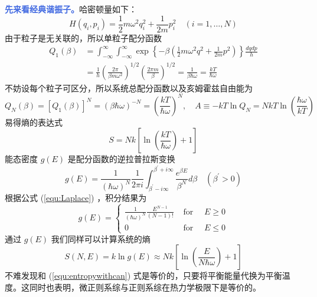 \textcolor{RoyalBlue}{\textbf{\kaishu 先来看经典谐振子。}}哈密顿量如下：
\begin{equation}
    H\left(q_i, p_i\right)=\frac{1}{2} m \omega^2 q_i^2+\frac{1}{2 m} p_i^2 \quad(i=1, \ldots, N)
\end{equation}
由于粒子是无关联的，所以单粒子配分函数
\begin{equation}
    \begin{aligned}
        Q_1(\beta) & =\int_{-\infty}^{\infty} \int_{-\infty}^{\infty} \exp \left\{-\beta\left(\frac{1}{2} m \omega^2 q^2+\frac{1}{2 m} p^2\right)\right\} \frac{d q d p}{h} \\
        & =\frac{1}{h}\left(\frac{2 \pi}{\beta m \omega^2}\right)^{1 / 2}\left(\frac{2 \pi m}{\beta}\right)^{1 / 2}=\frac{1}{\beta \hbar \omega}=\frac{k T}{\hbar \omega}
        \end{aligned}
\end{equation}
不妨设每个粒子可区分，所以系统总配分函数以及亥姆霍兹自由能为
\begin{equation}
    Q_N(\beta)=\left[Q_1(\beta)\right]^N=(\beta \hbar \omega)^{-N}=\left(\frac{k T}{\hbar \omega}\right)^N,\quad A \equiv-k T \ln Q_N=N k T \ln \left(\frac{\hbar \omega}{k T}\right)
\end{equation}
易得熵的表达式
\begin{equation}\label{equ:entropywithcan}
    S=N k\left[\ln \left(\frac{k T}{\hbar \omega}\right)+1\right]
\end{equation}
能态密度 $g(E)$ 是配分函数的逆拉普拉斯变换
\begin{equation}
    g(E)=\frac{1}{(\hbar \omega)^N} \frac{1}{2 \pi i} \int_{\beta^{\prime}-i \infty}^{\beta^{\prime}+i \infty} \frac{e^{\beta E}}{\beta^N} d \beta \quad\left(\beta^{\prime}>0\right)
\end{equation}
根据公式 (\ref*{equ:Laplace}) ，积分结果为
\begin{equation}
    g(E)= \begin{cases}\frac{1}{(\hbar \omega)^N} \frac{E^{N-1}}{(N-1) !} & \text { for } \quad E \geq 0 \\ 0 & \text { for } \quad E \leq 0\end{cases}
\end{equation}
通过 $g(E)$ 我们同样可以计算系统的熵
\begin{equation}
    S(N, E)=k \ln g(E) \approx N k\left[\ln \left(\frac{E}{N \hbar \omega}\right)+1\right]
\end{equation}
不难发现和 (\ref*{equ:entropywithcan}) 式是等价的，只要将平衡能量代换为平衡温度。这同时也表明，微正则系综与正则系综在热力学极限下是等价的。

